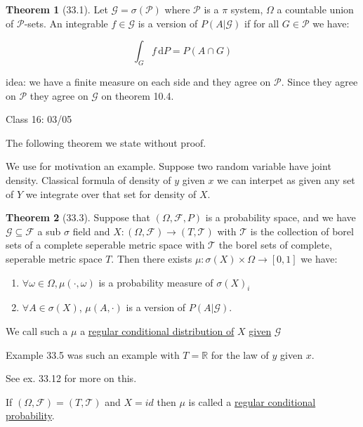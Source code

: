 \documentclass{article}
\theoremstyle{definition}
\newtheorem{theorem}{Theorem}
\begin{document}
\begin{theorem}
    [33.1]

    Let \(\mathscr{G} = \sigma(\mathscr{P})\) where \(\mathscr{P}\) is a \(\pi\) system, \(\Omega\) a countable union of \(\mathscr{P}\)-sets. An integrable \(f\in \mathscr{G}\) is a version of \(P(A|\mathscr{G})\) if for all \(G\in \mathscr{P}\) we have:

    \[
        \int_{G}^{} f \,\mathrm{d}P = P(A\cap G)
    \]
\end{theorem}

idea: we have a finite measure on each side and they agree on \(\mathscr{P}\). Since they agree on \(\mathscr{P}\) they agree on \(\mathscr{G}\) on theorem 10.4.

\hrulefill

Class 16: 03/05

The following theorem we state without proof.

We use for motivation an example. Suppose two random variable have joint density. Classical formula of density of \(y\) given \(x\) we can interpet as given any set of \(Y\) we integrate over that set for density of \(X\).

\begin{theorem}
    [33.3]

    Suppose that \((\Omega ,\mathscr{F} , P)\) is a probability space, and we have \(\mathscr{G} \subseteq \mathscr{F} \) a sub \(\sigma\) field and \(X: (\Omega, \mathscr{F}) \to (T, \mathscr{T})\) with \(\mathscr{T}\) is the collection of borel sets of a complete seperable metric space with \(\mathscr{T}\) the borel sets of complete, seperable metric space \(T\). Then there exists \(\mu : \sigma (X)\times \Omega \to [0,1]\) we have:

    \begin{enumerate}
        \item \(\forall \omega \in \Omega, \mu (\cdot,\omega)\) is a probability measure of \(\sigma(X)_i\) 
        \item \(\forall A\in \sigma (X)\), \(\mu (A,\cdot)\) is a version of \(P(A|\mathscr{G})\).
    \end{enumerate}

    We call such a \(\mu\) a \underline{regular conditional distribution of} \(X\) \underline{given} \(\mathscr{G}\)
    
    Example 33.5 was such an example with \(T = \mathbb{R}\) for the law of \(y\) given \(x\).

    See ex. 33.12 for more on this.

    If \((\Omega , \mathscr{F} ) = (T, \mathscr{T})\) and \(X = id\) then \(\mu \) is called a \underline{regular conditional probability}.

\end{theorem}
\end{document}
